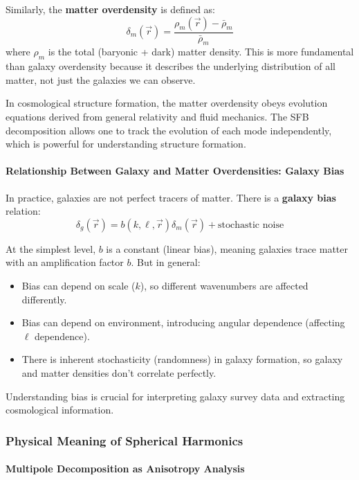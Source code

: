 Similarly, the \textbf{matter overdensity} is defined as:
\begin{equation}
\delta_m(\vec{r}) = \frac{\rho_m(\vec{r}) - \bar{\rho}_m}{\bar{\rho}_m}
\end{equation}
where $\rho_m$ is the total (baryonic + dark) matter density. This is more fundamental than galaxy overdensity because it describes the underlying distribution of all matter, not just the galaxies we can observe.

In cosmological structure formation, the matter overdensity obeys evolution equations derived from general relativity and fluid mechanics. The SFB decomposition allows one to track the evolution of each mode independently, which is powerful for understanding structure formation.

\paragraph{Relationship Between Galaxy and Matter Overdensities: Galaxy Bias}

In practice, galaxies are not perfect tracers of matter. There is a \textbf{galaxy bias} relation:
\begin{equation}
\delta_g(\vec{r}) = b(k, \ell, \vec{r}) \delta_m(\vec{r}) + \text{stochastic noise}
\end{equation}

At the simplest level, $b$ is a constant (linear bias), meaning galaxies trace matter with an amplification factor $b$. But in general:
\begin{itemize}
    \item Bias can depend on scale ($k$), so different wavenumbers are affected differently.
    \item Bias can depend on environment, introducing angular dependence (affecting $\ell$ dependence).
    \item There is inherent stochasticity (randomness) in galaxy formation, so galaxy and matter densities don't correlate perfectly.
\end{itemize}

Understanding bias is crucial for interpreting galaxy survey data and extracting cosmological information.

\subsubsection{Physical Meaning of Spherical Harmonics}

\paragraph{Multipole Decomposition as Anisotropy Analysis}

